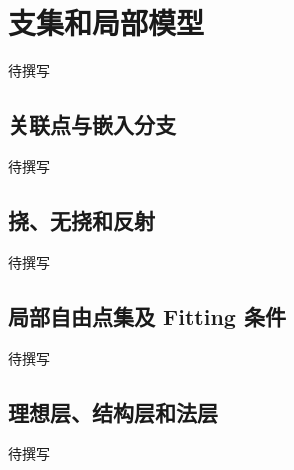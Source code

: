 
% 
% 

\section{支集和局部模型}
\label{g5:sec:1304}

待撰写

\subsection{关联点与嵌入分支}
\label{g5:subsec:1304:01}
待撰写

\subsection{挠、无挠和反射}
\label{g5:subsec:1304:02}
待撰写

\subsection{局部自由点集及 Fitting 条件}
\label{g5:subsec:1304:03}
待撰写

\subsection{理想层、结构层和法层}
\label{g5:subsec:1304:04}
待撰写
